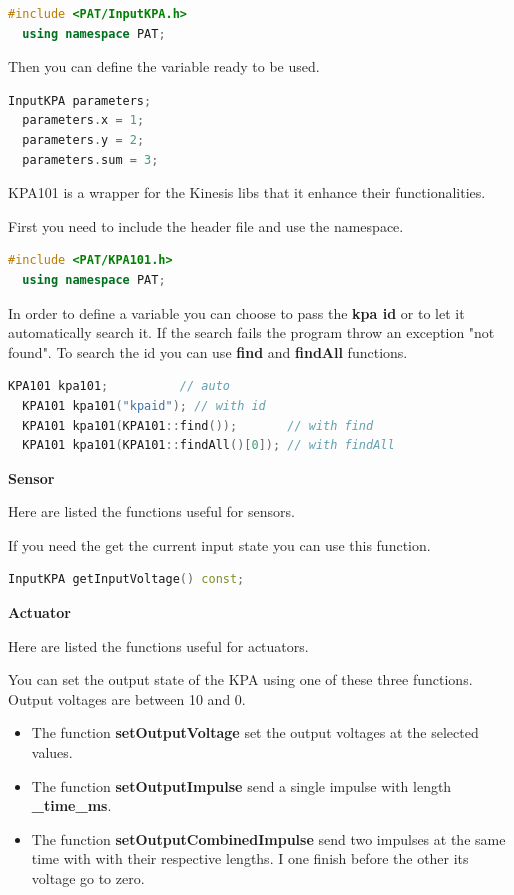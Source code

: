 \begin{lstlisting}[language=c++, gobble=2]
  #include <PAT/InputKPA.h>
  using namespace PAT;  
\end{lstlisting}

Then you can define the variable ready to be used.

\begin{lstlisting}[language=c++, gobble=2]
  InputKPA parameters;
  parameters.x = 1;
  parameters.y = 2;
  parameters.sum = 3;
\end{lstlisting}


KPA101 is a wrapper for the Kinesis libs that it enhance their
functionalities.

First you need to include the header file and use the namespace.

\begin{lstlisting}[language=c++, gobble=2]
  #include <PAT/KPA101.h>
  using namespace PAT;
\end{lstlisting}

In order to define a variable you can choose to pass the \textbf{kpa id}
or to let it automatically search it. If the search fails the program
throw an exception "not found". To search the id you can use
\textbf{find} and \textbf{findAll} functions.

\begin{lstlisting}[language=c++, gobble=2]
  KPA101 kpa101;          // auto
  KPA101 kpa101("kpaid"); // with id
  KPA101 kpa101(KPA101::find());       // with find
  KPA101 kpa101(KPA101::findAll()[0]); // with findAll
\end{lstlisting}

\textbf{Sensor}

Here are listed the functions useful for sensors.

If you need the get the current input state you can use this function.

\begin{lstlisting}[language=c++, gobble=2]
  InputKPA getInputVoltage() const;
\end{lstlisting}

\textbf{Actuator}

Here are listed the functions useful for actuators.

You can set the output state of the KPA using one of these three
functions. Output voltages are between 10 and 0.

\begin{itemize}
  \tightlist
  \item
        The function \textbf{setOutputVoltage} set the output voltages at the
        selected values.
  \item
        The function \textbf{setOutputImpulse} send a single impulse with
        length \textbf{\_time\_ms}.
  \item
        The function \textbf{setOutputCombinedImpulse} send two impulses at
        the same time with with their respective lengths. I one finish before
        the other its voltage go to zero.
\end{itemize}

